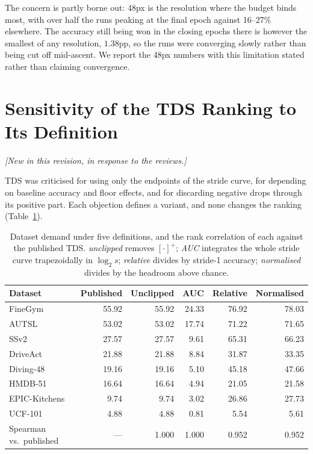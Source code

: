 \documentclass[runningheads]{llncs}
\newcommand{\tabtight}{\setlength{\tabcolsep}{3.5pt}\renewcommand{\arraystretch}{1.12}}
\newcommand{\TDS}{\textsc{TDS}}
\newcommand{\rev}[1]{\textcolor{revblue}{#1}}
\newcommand{\revnote}{\noindent\textcolor{revblue}{\small\itshape
  [New in this revision, in response to the reviews.]}\par\vspace{2pt}}
\begin{document}
The concern is partly borne out: 48px is the resolution where the budget binds
most, with over half the runs peaking at the final epoch against 16--27\%
elsewhere. The accuracy still being won in the closing epochs there is however
the smallest of any resolution, $1.38$pp, so the runs were converging slowly
rather than being cut off mid-ascent. We report the 48px numbers with this
limitation stated rather than claiming convergence.

\section{\rev{Sensitivity of the \texorpdfstring{\TDS{}}{TDS} Ranking to Its Definition}}
\revnote
\label{sec:sup_tds_variants}

\TDS{} was criticised for using only the endpoints of the stride curve, for
depending on baseline accuracy and floor effects, and for discarding negative
drops through its positive part. Each objection defines a variant, and none
changes the ranking (Table~\ref{tab:sup_tds_variants}).

\begin{table}[!htbp]
\centering
\caption{Dataset demand under five definitions, and the rank correlation of each
against the published \TDS{}. \emph{unclipped} removes $[\cdot]^+$;
\emph{AUC} integrates the whole stride curve trapezoidally in $\log_2 s$;
\emph{relative} divides by stride-1 accuracy; \emph{normalised} divides by the
headroom above chance.}
\label{tab:sup_tds_variants}
\scriptsize\tabtight
\begin{tabular}{l rrrrr}
\toprule
Dataset & Published & Unclipped & AUC & Relative & Normalised \\
\midrule
FineGym       & 55.92 & 55.92 & 24.33 & 76.92 & 78.03 \\
AUTSL         & 53.02 & 53.02 & 17.74 & 71.22 & 71.65 \\
SSv2          & 27.57 & 27.57 &  9.61 & 65.31 & 66.23 \\
DriveAct      & 21.88 & 21.88 &  8.84 & 31.87 & 33.35 \\
Diving-48     & 19.16 & 19.16 &  5.10 & 45.18 & 47.66 \\
HMDB-51       & 16.64 & 16.64 &  4.94 & 21.05 & 21.58 \\
EPIC-Kitchens &  9.74 &  9.74 &  3.02 & 26.86 & 27.73 \\
UCF-101       &  4.88 &  4.88 &  0.81 &  5.54 &  5.61 \\
\midrule
Spearman vs.\ published & --- & 1.000 & 1.000 & 0.952 & 0.952 \\
\bottomrule
\end{tabular}
\end{table}
\end{document}
